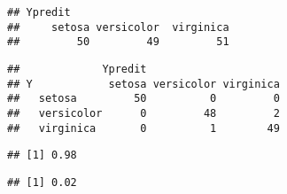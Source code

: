\documentclass[
]{article}
\newenvironment{Shaded}{\begin{snugshade}}{\end{snugshade}}
\newcommand{\CommentTok}[1]{\textcolor[rgb]{0.56,0.35,0.01}{\textit{#1}}}
\newcommand{\DataTypeTok}[1]{\textcolor[rgb]{0.13,0.29,0.53}{#1}}
\newcommand{\KeywordTok}[1]{\textcolor[rgb]{0.13,0.29,0.53}{\textbf{#1}}}
\newcommand{\NormalTok}[1]{#1}
\newcommand{\OperatorTok}[1]{\textcolor[rgb]{0.81,0.36,0.00}{\textbf{#1}}}
\newcommand{\StringTok}[1]{\textcolor[rgb]{0.31,0.60,0.02}{#1}}
\begin{document}
\begin{verbatim}
## Ypredit
##     setosa versicolor  virginica 
##         50         49         51
\end{verbatim}

\begin{Shaded}
\end{Shaded}

\begin{verbatim}
##             Ypredit
## Y            setosa versicolor virginica
##   setosa         50          0         0
##   versicolor      0         48         2
##   virginica       0          1        49
\end{verbatim}

\begin{Shaded}
\end{Shaded}

\begin{verbatim}
## [1] 0.98
\end{verbatim}

\begin{Shaded}
\end{Shaded}

\begin{verbatim}
## [1] 0.02
\end{verbatim}
\end{document}
